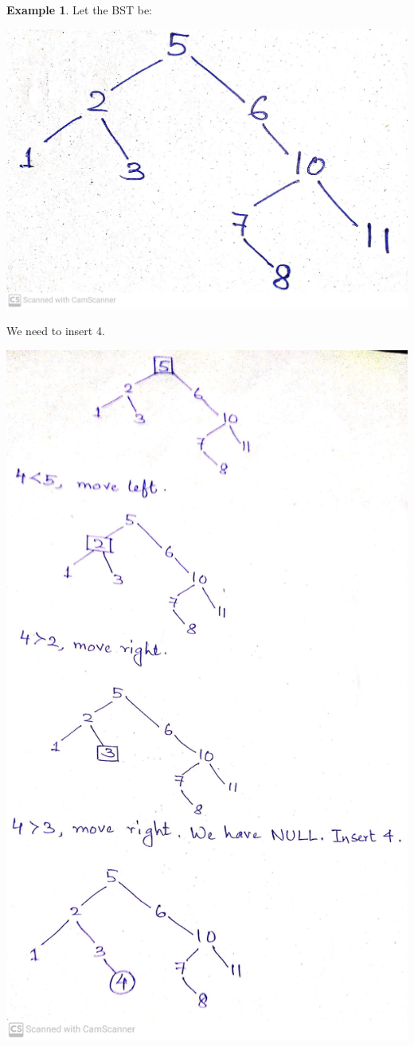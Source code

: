 \documentclass[10pt, a4paper]{extarticle}
\theoremstyle{definition}
\newtheorem{eg}{Example}
\begin{document}
	\begin{eg}
		Let the BST be:
		\begin{center}
			\includegraphics[scale=0.07]{bst1.jpg}\\
		\end{center}
		We need to insert 4.
		\begin{center}
			\includegraphics[scale=0.16]{bst3.jpg}\\

\end{center}
\end{eg}
\end{document}
